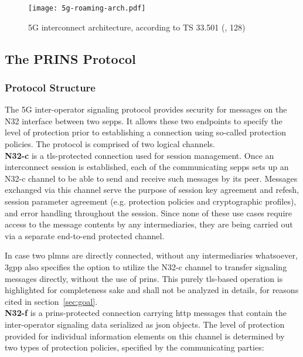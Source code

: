 \begin{figure}[h!]
    \texttt{[image: 5g-roaming-arch.pdf]}
    \centering
    \caption{5G interconnect architecture, according to TS 33.501 (\cite{3gpp.33.501}, 128)}
    \label{fig:n32}
\end{figure}

\subsection{The PRINS Protocol}
\subsubsection{Protocol Structure}

The 5G inter-operator signaling protocol provides security for messages on the N32 interface between two \glspl{sepp}.
It allows these two endpoints to specify the level of protection prior to establishing a connection using so-called protection policies.
The protocol is comprised of two logical channels.
\\

\textbf{N32-c} is a \gls{tls}-protected connection used for session management.
Once an interconnect session is established, each of the communicating \glspl{sepp} sets up an N32-c channel to be able to send and receive such messages by its peer.
Messages exchanged via this channel serve the purpose of session key agreement and refesh, session parameter agreement (e.g. protection policies and cryptographic profiles), and error handling throughout the session. Since none of these use cases require access to the message contents by any intermediaries, they are being carried out via a separate end-to-end protected channel.

In case two \glspl{plmn} are directly connected, without any intermediaries whatsoever, \gls{3gpp} also specifies the option to utilize the N32-c channel to transfer signaling messages directly, without the use of \gls{prins}.
This purely \gls{tls}-based operation is highlighted for completeness sake and shall not be analyzed in details, for reasons cited in section~\ref{sec:goal}.
\\

\textbf{N32-f} is a \gls{prins}-protected connection carrying \gls{http} messages that contain the inter-operator signaling data serialized as \gls{json} objects.
The level of protection provided for individual information elements on this channel is determined by two types of protection policies, specified by the communicating parties:

